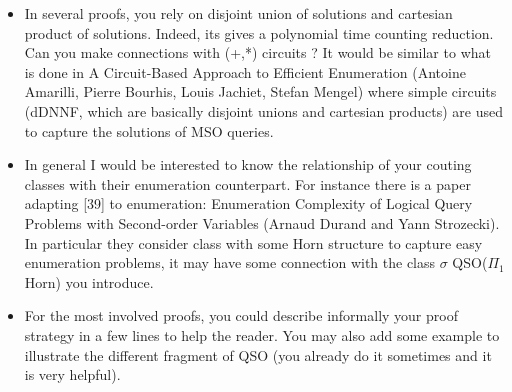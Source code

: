 \documentclass[a4paper]{article}
\begin{document}
\begin{itemize}
		\setlength\itemsep{0.5em}
\item In several proofs, you rely on disjoint union of solutions and cartesian product of solutions. Indeed, its gives a polynomial time counting reduction. Can you make connections with (+,*) circuits ? It would be similar to what is done in A Circuit-Based Approach to Efficient Enumeration (Antoine Amarilli, Pierre Bourhis, Louis Jachiet, Stefan Mengel) where simple circuits (dDNNF, which are basically disjoint unions and cartesian products) are used to capture the solutions of MSO queries.

\item In general I would be interested to know the relationship of your couting classes with their enumeration counterpart. 
For instance there is a paper adapting [39] to enumeration: Enumeration Complexity of Logical Query Problems with Second-order Variables (Arnaud Durand and Yann Strozecki). In particular they consider class with some Horn structure to capture easy enumeration problems, it may have some connection with the class $\sigma$ QSO($\Pi_1$ Horn) you introduce.

\item For the most involved proofs, you could describe informally your proof strategy in a few lines to help the reader. You may also add some example to illustrate the different fragment of QSO (you already do it sometimes and it is very helpful).


\end{itemize}
\end{document}
